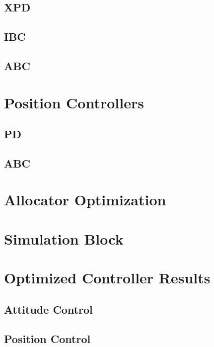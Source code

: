 \subsection{XPD}
\subsection{IBC}
\subsection{ABC}
\section{Position Controllers}
\subsection{PD}
\subsection{ABC}
\section{Allocator Optimization}
\label{sec:simulation.allocator}
\section{Simulation Block}
\label{sec:simulation.block}
\section{Optimized Controller Results}
\label{sec:simulation.comparison}
\subsection{Attitude Control}
\label{subsec:simulation.comparison.attitude}
\subsection{Position Control}
\label{subsec:simulation.comparison.position}
